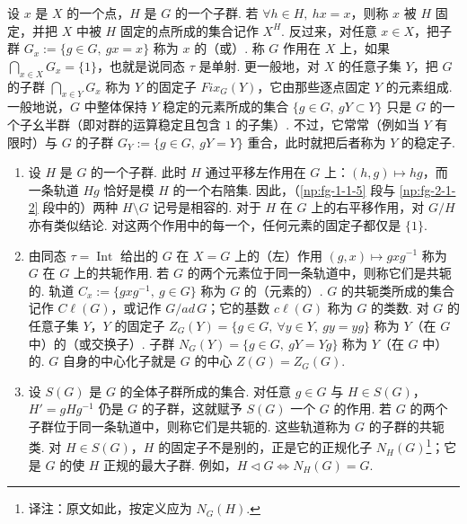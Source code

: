 \begin{numpara}[不动点与稳定子]\label{np:fg-2-1-3}
设 $x$ 是 $X$ 的一个点，$H$ 是 $G$ 的一个子群. 若 $\forall h\in H,\ hx=x$，则称 $x$ 被 $H$ 固定，并把 $X$ 中被 $H$ 固定的点所成的集合记作 $X^H$. 反过来，对任意 $x\in X$，把子群 $G_x:=\{g\in G,\ gx=x\}$ 称为 $x$ 的（或）. 称 $G$ 作用在 $X$ 上，如果 $\bigcap_{x\in X}G_x=\{1\}$，也就是说同态 $\tau$ 是单射. 更一般地，对 $X$ 的任意子集 $Y$，把 $G$ 的子群 $\bigcap_{x\in Y}G_x$ 称为 $Y$ 的固定子 $\mathit{Fix}_G(Y)$，它由那些逐点固定 $Y$ 的元素组成. 一般地说，$G$ 中整体保持 $Y$ 稳定的元素所成的集合 $\{g\in G,\ gY\subset Y\}$ 只是 $G$ 的一个子幺半群（即对群的运算稳定且包含 $1$ 的子集）. 不过，它常常（例如当 $Y$ 有限时）与 $G$ 的子群 $G_Y:=\{g\in G,\ gY=Y\}$ 重合，此时就把后者称为 $Y$ 的稳定子.
\end{numpara}
\begin{numpara}[例]\label{np:fg-2-1-4}
\begin{enumerate}[label=\roman*)]
\item 设 $H$ 是 $G$ 的一个子群. 此时 $H$ 通过平移左作用在 $G$ 上：$(h,g)\mapsto hg$，而一条轨道 $Hg$ 恰好是模 $H$ 的一个右陪集. 因此，（\ref{np:fg-1-1-5} 段与 \ref{np:fg-2-1-2} 段中的）两种 $H\setminus G$ 记号是相容的. 对于 $H$ 在 $G$ 上的右平移作用，对 $G/H$ 亦有类似结论. 对这两个作用中的每一个，任何元素的固定子都仅是 $\{1\}$.
\item 由同态 $\tau=\operatorname{Int}$ 给出的 $G$ 在 $X=G$ 上的（左）作用 $(g,x)\mapsto gxg^{-1}$ 称为 $G$ 在 $G$ 上的共轭作用. 若 $G$ 的两个元素位于同一条轨道中，则称它们是共轭的. 轨道 $C_x:=\{gxg^{-1},\ g\in G\}$ 称为 $G$ 的（元素的）. $G$ 的共轭类所成的集合记作 $C\ell(G)$，或记作 $G/\mathit{ad}\,G$；它的基数 $c\ell(G)$ 称为 $G$ 的类数. 对 $G$ 的任意子集 $Y$，$Y$ 的固定子 $Z_G(Y)=\{g\in G,\ \forall y\in Y,\ gy=yg\}$ 称为 $Y$（在 $G$ 中）的（或交换子）. 子群 $N_G(Y)=\{g\in G,\ gY=Yg\}$ 称为 $Y$（在 $G$ 中）的. $G$ 自身的中心化子就是 $G$ 的中心 $Z(G)=Z_G(G)$.
\item 设 $S(G)$ 是 $G$ 的全体子群所成的集合. 对任意 $g\in G$ 与 $H\in S(G)$，$H'=gHg^{-1}$ 仍是 $G$ 的子群，这就赋予 $S(G)$ 一个 $G$ 的作用. 若 $G$ 的两个子群位于同一条轨道中，则称它们是共轭的. 这些轨道称为 $G$ 的子群的共轭类. 对 $H\in S(G)$，$H$ 的固定子不是别的，正是它的正规化子 $N_H(G)$\footnote{译注：原文如此，按定义应为 $N_G(H)$.}；它是 $G$ 的使 $H$ 正规的最大子群. 例如，$H\triangleleft G\iff N_H(G)=G$.
\end{enumerate}
\end{numpara}

